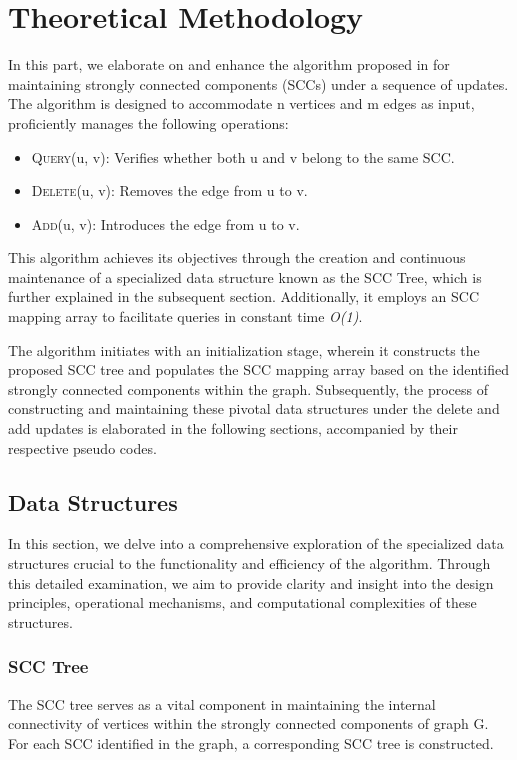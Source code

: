 \section{Theoretical Methodology}\label{Sec: Theoretical Methodology}

In this part, we elaborate on and enhance the algorithm proposed in \cite{scc_tree_reference}
for maintaining strongly connected components (SCCs) under a sequence of updates. 
The algorithm is designed to accommodate n vertices and m edges as input, proficiently manages the following operations:
\begin{itemize}
 \item  \textsc{Query}(u, v): Verifies whether both u and v belong to the same SCC.
 \item  \textsc{Delete}(u, v): Removes the edge from u to v.
\item  \textsc{Add}(u, v): Introduces the edge from u to v.
\end{itemize}

This algorithm achieves its objectives through the creation and continuous maintenance of a specialized data structure known as the SCC Tree, 
which is further explained in the subsequent section. 
Additionally, it employs an SCC mapping array to facilitate queries in constant time \textit{O(1)}.

The algorithm initiates with an initialization stage, wherein it constructs the proposed SCC tree 
and populates the SCC mapping array based on the identified strongly connected components within the graph. 
Subsequently, the process of constructing and maintaining these pivotal data structures under the delete and add updates is elaborated in the following sections, accompanied by their respective pseudo codes.

\subsection{Data Structures}\label{Subsec: Data Structures Theoretical}

In this section, we delve into a comprehensive exploration of the specialized data structures crucial to the functionality 
and efficiency of the algorithm. Through this detailed examination, we aim to provide clarity 
and insight into the design principles, operational mechanisms, and computational complexities of these structures.

\subsubsection{SCC Tree}\label{Subsubsec: SCC Tree}
The SCC tree serves as a vital component in maintaining the internal connectivity of vertices within the strongly connected components of graph G. 
For each SCC identified in the graph, a corresponding SCC tree is constructed.

